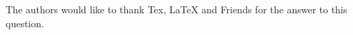 \begin{acknowledgements}
The authors would like to thank Tex, LaTeX and Friends 
for the answer to this question.
\end{acknowledgements}
